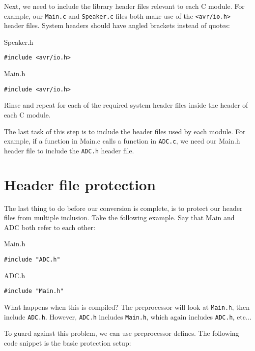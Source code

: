 \documentclass[a4paper,oneside,notitlepage]{article}
\begin{document}
Next, we need to include the library header files relevant to each C module. For example, our \texttt{Main.c} and \texttt{Speaker.c} files both make use of the \texttt{<avr/io.h>} header files. System headers should have angled brackets instead of quotes:

Speaker.h
\begin{center}
\begin{lstlisting}
#include <avr/io.h>
\end{lstlisting}
\end{center}

Main.h
\begin{center}
\begin{lstlisting}
#include <avr/io.h>
\end{lstlisting}
\end{center}

Rinse and repeat for each of the required system header files inside the header of each C module.

The last task of this step is to include the header files used by each module. For example, if a function in Main.c calls a function in \texttt{ADC.c}, we need our Main.h header file to include the \texttt{ADC.h} header file.

\section{Header file protection}

The last thing to do before our conversion is complete, is to protect our header files from multiple inclusion. Take the following example. Say that Main and ADC both refer to each other:

Main.h
\begin{center}
\begin{lstlisting}
#include "ADC.h"
\end{lstlisting}
\end{center}

ADC.h
\begin{center}
\begin{lstlisting}
#include "Main.h"
\end{lstlisting}
\end{center}

What happens when this is compiled? The preprocessor will look at \texttt{Main.h}, then include \texttt{ADC.h}. However, \texttt{ADC.h} includes \texttt{Main.h}, which again includes \texttt{ADC.h}, etc...

To guard against this problem, we can use preprocessor defines. The following code snippet is the basic protection setup:
\end{document}
